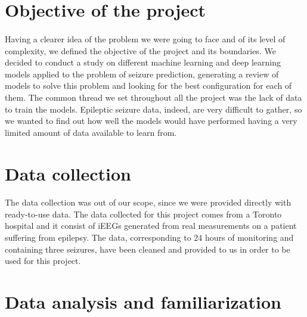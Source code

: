 
\section{Objective of the project} \label{sec: step_objective_project}
\paragraph{} Having a clearer idea of the problem we were going to face and of its level of complexity, we defined the objective of the project and its boundaries. We decided to conduct a study on different machine learning and deep learning models applied to the problem of seizure prediction, generating a review of models to solve this problem and looking for the best configuration for each of them. The common thread we set throughout all the project was the lack of data to train the models. Epileptic seizure data, indeed, are very difficult to gather, so we wanted to find out how well the models would have performed having a very limited amount of data available to learn from.


\section{Data collection} \label{sec: step_data_collection}
\paragraph{} The data collection was out of our scope, since we were provided directly with ready-to-use data. The data collected for this project comes from a Toronto hospital and it consist of iEEGs generated from real measurements on a patient suffering from epilepsy. The data, corresponding to 24 hours of monitoring and containing three seizures, have been cleaned and provided to us in order to be used for this project.


\section{Data analysis and familiarization} \label{sec: step_data_analysis_familiarization}

